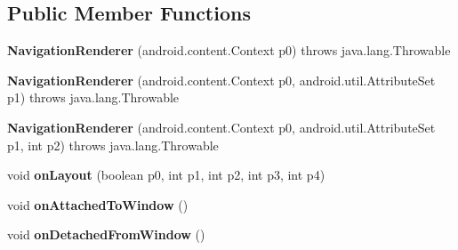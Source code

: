 \subsection*{Public Member Functions}
\begin{DoxyCompactItemize}
\item 
\hypertarget{classmd5282f1122c1313907b9bf274dd2c2f344_1_1NavigationRenderer_a1174e09836e6aa8e602ae10f166ad764}{}{\bfseries Navigation\+Renderer} (android.\+content.\+Context p0)  throws java.\+lang.\+Throwable 	\label{classmd5282f1122c1313907b9bf274dd2c2f344_1_1NavigationRenderer_a1174e09836e6aa8e602ae10f166ad764}

\item 
\hypertarget{classmd5282f1122c1313907b9bf274dd2c2f344_1_1NavigationRenderer_a05ef120daf36b8044ff3cad2a913b209}{}{\bfseries Navigation\+Renderer} (android.\+content.\+Context p0, android.\+util.\+Attribute\+Set p1)  throws java.\+lang.\+Throwable 	\label{classmd5282f1122c1313907b9bf274dd2c2f344_1_1NavigationRenderer_a05ef120daf36b8044ff3cad2a913b209}

\item 
\hypertarget{classmd5282f1122c1313907b9bf274dd2c2f344_1_1NavigationRenderer_abd81f8204af2b5d0dedbf6bfd348e123}{}{\bfseries Navigation\+Renderer} (android.\+content.\+Context p0, android.\+util.\+Attribute\+Set p1, int p2)  throws java.\+lang.\+Throwable 	\label{classmd5282f1122c1313907b9bf274dd2c2f344_1_1NavigationRenderer_abd81f8204af2b5d0dedbf6bfd348e123}

\item 
\hypertarget{classmd5282f1122c1313907b9bf274dd2c2f344_1_1NavigationRenderer_acd3d5a9281e3a45c3dda25e696c08595}{}void {\bfseries on\+Layout} (boolean p0, int p1, int p2, int p3, int p4)\label{classmd5282f1122c1313907b9bf274dd2c2f344_1_1NavigationRenderer_acd3d5a9281e3a45c3dda25e696c08595}

\item 
\hypertarget{classmd5282f1122c1313907b9bf274dd2c2f344_1_1NavigationRenderer_a6ddc1d164b8ece897f65db160e40cefd}{}void {\bfseries on\+Attached\+To\+Window} ()\label{classmd5282f1122c1313907b9bf274dd2c2f344_1_1NavigationRenderer_a6ddc1d164b8ece897f65db160e40cefd}

\item 
\hypertarget{classmd5282f1122c1313907b9bf274dd2c2f344_1_1NavigationRenderer_ad97b21c16b26d394d0afb63dc24b689e}{}void {\bfseries on\+Detached\+From\+Window} ()\label{classmd5282f1122c1313907b9bf274dd2c2f344_1_1NavigationRenderer_ad97b21c16b26d394d0afb63dc24b689e}


\end{DoxyCompactItemize}
